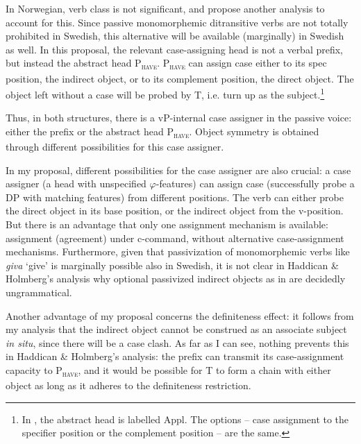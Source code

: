 \documentclass[output=paper]{langscibook}
\begin{document}
In Norwegian, verb class is not significant, and \citet{HaddicanHolmberg2019} propose another analysis to account for this. Since passive monomorphemic ditransitive verbs are not totally prohibited in Swedish, this alternative will be available (marginally) in Swedish as well. In this proposal, the relevant case-assigning head is not a verbal prefix, but instead the abstract head P\textsc{\textsubscript{have}}. P\textsc{\textsubscript{have}} can assign case either to its spec position, the indirect object, or to its complement position, the direct object. The object left without a case will be probed by T, i.e. turn up as the subject.\footnote{In \citet{HolmbergEtAl2019}, the abstract head is labelled Appl. The options – case assignment to the specifier position or the complement position – are the same.} 



Thus, in both structures, there is a vP-internal case assigner in the passive voice: either the prefix or the abstract head P\textsc{\textsubscript{have}}. Object symmetry is obtained through different possibilities for this case assigner. 



In my proposal, different possibilities for the case assigner are also crucial: a case assigner (a head with unspecified $\varphi ${}-features) can assign case (successfully probe a DP with matching features) from different positions. The verb can either probe the direct object in its base position, or the indirect object from the v-position. But there is an advantage that only one assignment mechanism is available: assignment (agreement) under c-command, without alternative case-assignment mechanisms. Furthermore, given that passivization of monomorphemic verbs like \textit{giva} ‘give’ is marginally possible also in Swedish, it is not clear in Haddican \& Holmberg’s analysis why optional passivized indirect objects as in  are decidedly ungrammatical.



Another advantage of my proposal concerns the definiteness effect: it follows from my analysis that the indirect object cannot be construed as an associate subject \textit{in situ}, since there will be a case clash. As far as I can see, nothing prevents this in Haddican \& Holmberg’s analysis: the prefix can transmit its case-assignment capacity to P\textsc{\textsubscript{have}}, and it would be possible for T to form a chain with either object as long as it adheres to the definiteness restriction.
\end{document}
